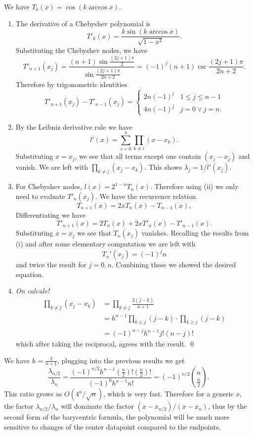 \documentclass{homework}
\begin{document}
\begin{problem} We have \(T_k(x) = \cos (k\arccos x)\).
\begin{enumerate}[label=(\roman*)]
\item The derivative of a Chebyshev polynomial is
\[T'_k(x) = \frac{k\sin(k\arccos x)}{\sqrt{1-x^2}}.\] Substituting the Chebyshev nodes, we have
\[T'_{n+1}(x_j) = \frac{(n+1)\sin \frac{ (2j+1)\pi}{2}}{\sin\frac{(2j+1)\pi}{2n+2}} = (-1)^{j}(n+1)\csc\frac{(2j+1)\pi}{2n+2}.\]
Therefore by trigonometric identities
\[T'_{n+1}(x_j) - T'_{n-1}(x_j) = \begin{cases}
2n(-1)^j & 1 \le j \le n-1\\
4n(-1)^j & j = 0 \lor j = n.
\end{cases}\]
\item By the Leibniz derivative rule we have
\[l'(x) = \sum_{i=0}^n \prod_{k\ne i} (x - x_k).\]
Substituting \(x = x_j\), we see that all terms except one contain \((x_j - x_j)\) and vanish. We are left with \(\prod_{k\ne j} (x_j - x_k)\). This shows \(\lambda_j = 1/l'(x_j)\).
\item For Chebyshev nodes, \(l(x) = 2^{1-n}T_n(x)\). Therefore using (ii) we only need to evaluate \(T'_n(x_j)\). We have the recurrence relation
\[T_{n+1}(x) = 2xT_n(x) - T_{n-1}(x),\]
Differentiating we have
\[T'_{n+1}(x) = 2T_n(x) + 2xT'_n(x) - T'_{n-1}(x).\]
Substituting \(x = x_j\) we see that \(T_n(x_j)\) vanishes. Recalling the results from (i) and after some elementary computation we are left with
\[T_n'(x_j) = (-1)^{j}n\]
and twice the result for \(j = 0, n\). Combining these we showed the desired equation.
\item \emph{On calcule!}
\[\begin{aligned}
\prod_{k\ne j} (x_j - x_k)
&= \prod_{k\ne j} \frac{2(j-k)}{n+1}\\
&= h^{n-1}\prod_{k \le j} (j-k) \cdot \prod_{k\ge j} (j-k)\\
&= (-1)^{n-j} h^{n-1} j! (n-j)!
\end{aligned}\]
which after taking the reciprocal, agrees with the result. \qed
\end{enumerate}
\renewcommand{\qed}{}
\end{problem}

\begin{problem}

\end{problem}

\begin{problem}
We have \(h = \frac2{n+1}\), plugging into the previous results we get
\[\frac{\lambda_{n/2}}{\lambda_n} = \frac{(-1)^{n/2}h^{n-1} (\frac n2)! (\frac n2)!}{(-1)^0 h^{n-1} n!} = (-1)^{n/2} {n \choose \frac n2}.\]
This ratio grows as \(O(4^n / \sqrt n)\), which is very fast. Therefore for a generic \(x\), the factor \(\lambda_{n/2}/\lambda_n\) will dominate the factor \((x - x_{n/2})/(x-x_n)\), thus by the second form of the barycentric formula, the polynomial will be much more sensitive to changes of the center datapoint compared to the endpoints.
\end{problem}
\end{document}
